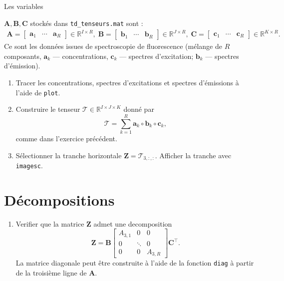Les variables {$\mathbf{A}, \mathbf{B}, \mathbf{C}$ stockés dans \lstinline{td_tenseurs.mat}  sont :
\[
\begin{split}
\mathbf{A} = \begin{bmatrix} \mathbf{a}_1 & \cdots & \mathbf{a}_R \end{bmatrix} \in \mathbb{R}^{I \times R},\;
\mathbf{B} = \begin{bmatrix} \mathbf{b}_1 & \cdots & \mathbf{b}_R \end{bmatrix} \in \mathbb{R}^{J \times R},\;
\mathbf{C} = \begin{bmatrix} \mathbf{c}_1 & \cdots & \mathbf{c}_R \end{bmatrix} \in \mathbb{R}^{K \times R}.
\end{split}
\]
Ce sont les données issues de spectroscopie de fluorescence (mélange de $R$ composants, $\mathbf{a}_k$ --- concentrations, $\mathbf{c}_k$ --- spectres d'excitation; $\mathbf{b}_k$ --- spectres d'émission).

\begin{enumerate}
\item Tracer les concentrations, spectres d'excitations et spectres d'émissions à l'aide de {\tt plot}.
\item Construire le tenseur $\mathcal{T} \in \mathbb{R}^{I \times J \times K}$ donné par 
\[
\mathcal{T} = \sum_{k=1}^{R} \mathbf{a}_k \circ  \mathbf{b}_k  \circ  \mathbf{c}_k,
\]
comme dans l'exercice précédent.

\item Sélectionner la tranche horizontale $\mathbf{Z} = \mathcal{T}_{3,:,:}$. Afficher la tranche avec {\tt imagesc}.

\end{enumerate}

\section{Décompositions}
\begin{enumerate}
\item Verifier  que la matrice $\mathbf{Z}$ admet une decomposition
\[
\mathbf{Z} = \mathbf{B} \begin{bmatrix} A_{3,1} & 0 & 0 \\
0 & \ddots & 0 \\ 0&0& A_{3,R}\end{bmatrix}   \mathbf{C}^{\top}.
\]
La matrice diagonale peut être construite à l'aide de la fonction {\tt diag} à partir de la troisième ligne de $\mathbf{A}$.


\end{enumerate}}
